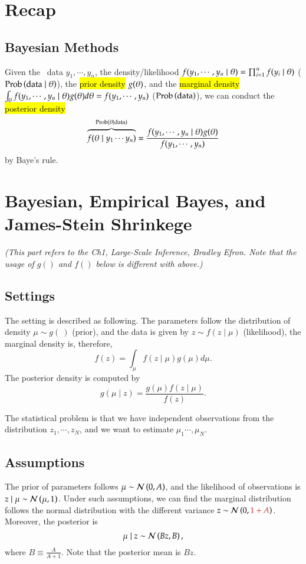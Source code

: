 \documentclass{Theme}
\date{Dec. 15, 2022}
\begin{document}
\ujtitle 
\section{Recap}
\subsection{Bayesian Methods}
Given the \iid\ data $y_1,\cdots,y_n$,  the density/likelihood 
$f(y_1,\cdots,y_n\mid\theta)=\prod_{i=1}^nf(y_i\mid\theta)$ ($\text{Prob}\left(\text{data}\mid\theta\right)$),
the \hl{prior density} $g(\theta)$, and the \hl{marginal density} $\int_\theta f(y_1,\cdots,y_n\mid\theta)g(\theta)d\theta=f(y_1,\cdots,y_n)$
($\text{Prob}\left(\text{data}\right)$),
we can conduct the \hl{posterior density}
\[
  \overbrace{f(\theta\mid y_1\cdots y_n)}^{\text{Prob}\left(\theta\mid\text{data}\right)}=\frac{f(y_1,\cdots,y_n\mid\theta)g(\theta)}{f(y_1,\cdots,y_n)}
\]
by Baye's rule.

\section{Bayesian, Empirical Bayes, and James-Stein Shrinkege}
{\it (This part refers to the Ch1, Large-Scale Inference, Bradley Efron. Note that the usage of $g()$ and $f()$ below is 
different with above.)}

\subsection{Settings}
The setting is described as following.
The parameters follow the distribution of density $\mu\sim g(\ )$ (prior), and the data is given by 
$z\sim f(z\mid\mu)$ (likelihood), the marginal density is, therefore, 
\[
  f(z)=\int_\mu f(z\mid\mu)g(\mu)d\mu.
\]
The posterior density is computed by 
\[
  g(\mu\mid z)=\frac{g(\mu)f(z\mid\mu)}{f(z)}.
\]

The statistical problem is that we have independent observations from the distribution
$z_1,\cdots,z_N$, and we want to estimate $\mu_1\cdots,\mu_N$.

\subsection{Assumptions}
The prior of parameters follows $\mu\sim\mathcal{N}\left(0,A\right)$, and the likelihood of observations is 
$z\mid\mu\sim\mathcal{N}\left(\mu,1\right)$.
Under such assumptions, we can find the marginal distribution follows the normal distribution
with the different variance
$z\sim\nor{0,\hl{1+A}}$.
Moreover, the posterior is 
\[
  \mu\mid z\sim\mathcal{N}\left(Bz,B\right),
\]
where $B\equiv\frac{A}{A+1}$. Note that the posterior mean is $Bz$.
\end{document}
